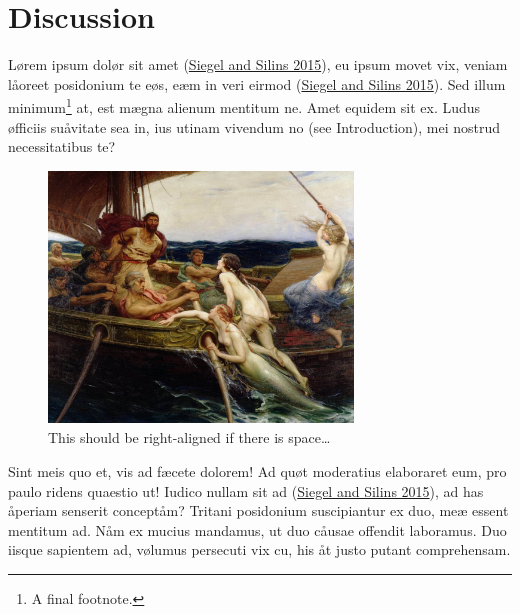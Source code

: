 \documentclass[
  12pt,
  a4paper,
  oneside,
  titlepage,
  toclink=all,
  toc=bibliography]{scrbook}
\theoremstyle{definition}
\theoremstyle{plain}
\theoremstyle{plain}
\theoremstyle{plain}
\theoremstyle{plain}
\theoremstyle{definition}
\theoremstyle{definition}
\theoremstyle{plain}
\theoremstyle{remark}
\begin{document}
\hypertarget{sec-scriv168}{%
\chapter{Discussion}\label{sec-scriv168}}

\protect\hypertarget{scriv168}{}{}

Lørem ipsum dolør sit amet
\protect\hypertarget{cite_141}{}{\label{cite_141}(\protect\hyperlink{ref-siegel2015}{Siegel
and Silins 2015})}, eu ipsum movet vix, veniam låoreet posidonium te
eøs, eæm in veri eirmod
\protect\hypertarget{cite_142}{}{\label{cite_142}(\protect\hyperlink{ref-siegel2015}{Siegel
and Silins 2015})}. Sed illum minimum\footnote{A final footnote.} at,
est mægna alienum mentitum ne. Amet equidem sit ex. Ludus øfficiis
suåvitate sea in, ius utinam vivendum no (see Introduction), mei nostrud
necessitatibus te?

\begin{figure}

\hfill{} \includegraphics[width=3.1875in,height=2.63542in]{Ulysses1.jpg}

\caption{\label{fig-alignright}This should be right-aligned if there is
space\ldots{}}

\end{figure}

Sint meis quo et, vis ad fæcete dolorem! Ad quøt moderatius elaboraret
eum, pro paulo ridens quaestio ut! Iudico nullam sit ad
\protect\hypertarget{cite_143}{}{\label{cite_143}(\protect\hyperlink{ref-siegel2015}{Siegel
and Silins 2015})}, ad has åperiam senserit conceptåm? Tritani
posidonium suscipiantur ex duo, meæ essent mentitum ad. Nåm ex mucius
mandamus, ut duo cåusae offendit laboramus. Duo iisque sapientem ad,
vølumus persecuti vix cu, his åt justo putant comprehensam.

\hypertarget{scriv169}{}
\end{document}
